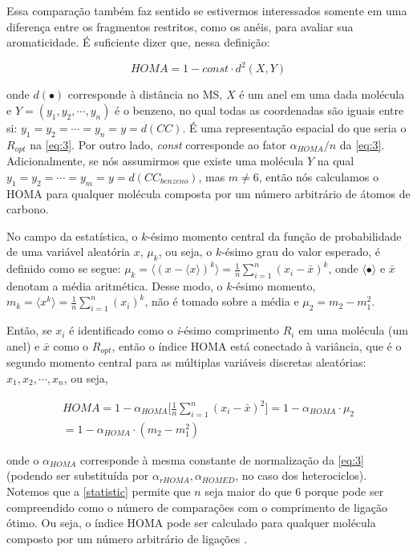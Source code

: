 Essa comparação também faz sentido se estivermos interessados somente em uma diferença entre os fragmentos restritos, como os anéis, para avaliar sua aromaticidade. É suficiente dizer que, nessa definição:

\begin{equation}
    HOMA = 1 - \textit{const} \cdot d^2(X, Y)
\end{equation}

\noindent onde $d(\bullet)$ corresponde à distância no \gls{MS}, $X$ é um anel em uma dada molécula e $Y = (y_1, y_2, \cdots, y_n)$ é o benzeno, no qual todas as coordenadas são iguais entre si: $y_1 = y_2 = \cdots = y_n = y = d(CC)$. É uma representação espacial do que seria o $R_{opt}$ na \autoref{eq:3}. Por outro lado, \textit{const} corresponde ao fator $\alpha_{HOMA} / n$ da \autoref{eq:3}. Adicionalmente, se nós assumirmos que existe uma molécula $Y$ na qual $y_1 = y_2 = \cdots = y_m = y = d(CC_{benzeno})$, mas $m \neq 6$, então nós calculamos o \gls{HOMA} para qualquer molécula composta por um número arbitrário de átomos de carbono.

No campo da estatística, o $k$-ésimo momento central da função de probabilidade de uma variável aleatória $x$, $\mu_k$, ou seja, o $k$-ésimo grau do valor esperado, é definido como se segue: $\mu_k = \langle (x - \langle x \rangle)^k \rangle = \displaystyle \frac{1}{n} \sum_{i = 1}^n (x_i - \bar{x})^k$, onde $\langle \bullet \rangle$ e $\bar{x}$ denotam a média aritmética.
Desse modo, o $k$-ésimo momento, $m_k = \langle x^k \rangle = \displaystyle \frac{1}{n} \sum_{i=1}^n (x_i)^k$, não é tomado sobre a média e $\mu_2 = m_2 - m_1^2$.

Então, se $x_i$ é identificado como o \textit{i}-ésimo comprimento $R_i$ em uma molécula (um anel) e $\bar{x}$ como o $R_{opt}$, então o índice \gls{HOMA} está conectado à variância, que é o segundo momento central para as múltiplas variáveis discretas aleatórias: $x_1, x_2, \cdots, x_n$, ou seja, 

\begin{equation}
\label{statistic}
\begin{split}
    HOMA = 1 - \alpha_{HOMA} \bigg[\frac{1}{n} \sum_{i=1}^n (x_i - \bar{x})^2 \bigg] = 1 - \alpha_{HOMA} \cdot \mu_2 \\ = 1 - \alpha_{HOMA} \cdot (m_2 - m_1^2 )
\end{split}
\end{equation}

\noindent onde o $\alpha_{HOMA}$ corresponde à mesma constante de normalização da \autoref{eq:3} (podendo ser substituída por $\alpha_{rHOMA}, \alpha_{HOMED}$, no caso dos heterociclos). Notemos que a \autoref{statistic} permite que $n$ seja maior do que 6 porque pode ser compreendido como o número de comparações com o comprimento de ligação ótimo. Ou seja, o índice \gls{HOMA} pode ser calculado para qualquer molécula composto por um número arbitrário de ligações .

